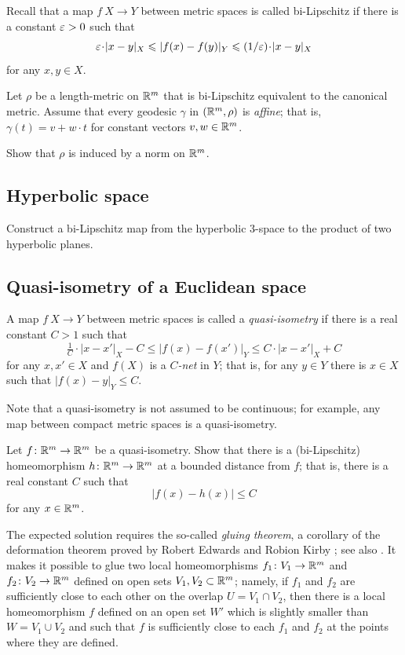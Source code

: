 Recall that a map $f\:X\to Y$ between metric spaces is called bi-Lipschitz if there is a constant $\varepsilon>0$ such that
\[\eps\cdot|x-y|_X\le|f(x)-f(y)|_Y\le\tfrac1\eps\cdot|x-y|_X\]
for any $x,y\in X$.

\begin{pr}
Let $\rho$ be a length-metric on $\mathbb{R}^m$ that is bi-Lipschitz equivalent to the canonical metric.
Assume that every geodesic $\gamma$ in $(\mathbb{R}^m,\rho)$ is \emph{affine};
that is, $\gamma(t)=v+w\cdot t$ for constant vectors $v,w\in\mathbb{R}^m$.

Show that $\rho$ is induced by a norm on $\mathbb{R}^m$.
\end{pr}

\subsection*{Hyperbolic space}
\label{Hyperbolic space}

\begin{pr}
Construct a bi-Lipschitz map from the hyperbolic $3$-space to the product of two hyperbolic planes.
\end{pr}

\subsection*{Quasi-isometry of a Euclidean space\thm}
\label{hom-near-QI} 

A map $f\:X\to Y$ between metric spaces is called a \emph{quasi-isometry} if there is a real constant $C>1$ such that
$$\tfrac{1}{C}\cdot|x-x'|_X-C
\le 
|f(x)-f(x')|_Y\le C\cdot|x-x'|_X+C$$
for any $x,x'\in X$ and $f(X)$ is a \emph{$C$-net} in $Y$;
that is, for any $y\in Y$ there is $x\in X$ such that $|f(x)-y|_Y\le C$.

Note that a quasi-isometry is not assumed to be continuous;
for example, any map between compact metric spaces is a quasi-isometry.

\begin{pr}
Let $f\colon\mathbb{R}^m\to\mathbb{R}^m$ be a quasi-isometry.
Show that there is a (bi-Lipschitz) homeomorphism 
$h\colon\mathbb{R}^m\to\mathbb{R}^m$ at a bounded distance from $f$;
that is, there is a real constant $C$ such that
$$|f(x)-h(x)|\le C$$
for any $x\in\mathbb{R}^m$.
\end{pr}

The expected solution requires the so-called \emph{gluing theorem}, a corollary of the deformation theorem proved by Robert Edwards and Robion Kirby \cite{edwards-kirby}; see also \cite{siebenmann}.
It makes it possible to glue two local homeomorphisms $f_1\colon V_1\to\mathbb{R}^m$ and $f_2\:V_2\z\to\RR^m$ defined on open sets $V_1, V_2\subset\mathbb{R}^m$;
namely, if $f_1$ and $f_2$ are sufficiently close to each other on the overlap $U=V_1\cap V_2$, then there is a local homeomorphism $f$ defined on an open set $W'$ which is slightly smaller than $W=V_1\cup V_2$ and such that $f$ is sufficiently close to each $f_1$ and $f_2$ at the points where they are defined.

